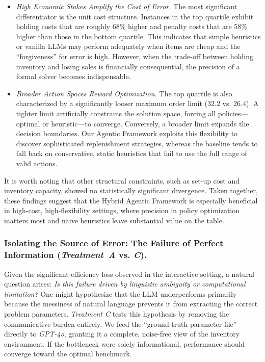 \documentclass[mnsc,nonblindrev]{informs3_hide}
\begin{document}
\begin{itemize}
    \item \emph{High Economic Stakes Amplify the Cost of Error.} 
    The most significant differentiator is the unit cost structure. Instances in the top quartile exhibit holding costs that are roughly $68\%$ higher and penalty costs that are $58\%$ higher than those in the bottom quartile. This indicates that simple heuristics or vanilla LLMs may perform adequately when items are cheap and the ``forgiveness'' for error is high. However, when the trade-off between holding inventory and losing sales is financially consequential, the precision of a formal solver becomes indispensable.
    
    \item \emph{Broader Action Spaces Reward Optimization.} 
    The top quartile is also characterized by a significantly looser maximum order limit ($32.2$ vs. $26.4$). A tighter limit artificially constrains the solution space, forcing all policies—optimal or heuristic—to converge. Conversely, a broader limit expands the decision boundaries. Our Agentic Framework exploits this flexibility to discover sophisticated replenishment strategies, whereas the baseline tends to fall back on conservative, static heuristics that fail to use the full range of valid actions.
\end{itemize}

It is worth noting that other structural constraints, such as set-up cost and inventory capacity, showed no statistically significant divergence. Taken together, these findings suggest that the Hybrid Agentic Framework is especially beneficial in high-cost, high-flexibility settings, where precision in policy optimization matters most and naive heuristics leave substantial value on the table.





\subsubsection{Isolating the Source of Error: The Failure of Perfect Information (\mbox{\emph{Treatment A}} vs. \emph{C}).}
\label{sec:cognitive_ceiling}

Given the significant efficiency loss observed in the interactive setting, a natural question arises: \emph{Is this failure driven by linguistic ambiguity or computational limitation?} One might hypothesize that the LLM underperforms primarily because the messiness of natural language prevents it from extracting the correct problem parameters.
\emph{Treatment C} tests this hypothesis by removing the communicative burden entirely. We feed the ``ground-truth parameter file'' directly to \emph{GPT-4o}, granting it a complete, noise-free view of the inventory environment. If the bottleneck were solely informational, performance should converge toward the optimal benchmark.
\vspace{-1em}
\end{document}
